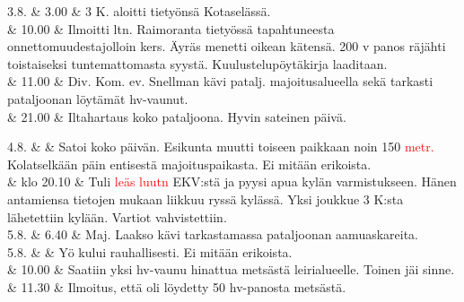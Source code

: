 \documentclass[11pt,a5paper,oneside]{book}
\begin{document}
\taulustop


3.8. & 3.00 & 3 K. aloitti tietyönsä Kotaselässä. \\

& 10.00 & Ilmoitti ltn. Raimoranta tietyössä tapahtuneesta onnettomuudestajolloin kers. Äyräs menetti oikean kätensä. 200 v panos räjähti toistaiseksi tuntemattomasta syystä. Kuulustelupöytäkirja laaditaan. \\

& 11.00 & Div. Kom. ev. Snellman kävi patalj. majoitusalueella sekä tarkasti pataljoonan löytämät hv-vaunut. \newline\newline\newline \\

& 21.00 & Iltahartaus koko pataljoona. \newline\newline Hyvin sateinen päivä. \\
\newpage

4.8. & & Satoi koko päivän. Esikunta muutti toiseen paikkaan noin 150 \textcolor{red}{metr.} Kolatselkään päin entisestä majoituspaikasta. \newline Ei mitään erikoista. \newline\newline \\

& klo 20.10 & Tuli \textcolor{red}{leäs luutn} EKV:stä ja pyysi apua kylän varmistukseen. Hänen antamiensa tietojen mukaan liikkuu ryssä kylässä. Yksi joukkue 3 K:sta lähetettiin kylään. Vartiot vahvistettiin. \newline \\

5.8. & 6.40 & Maj. Laakso kävi tarkastamassa pataljoonan aamuaskareita. \\

5.8. & & Yö kului rauhallisesti. Ei mitään erikoista. \\

& 10.00 & Saatiin yksi hv-vaunu hinattua metsästä leirialueelle. Toinen jäi sinne. \newline \\

& 11.30 & Ilmoitus, että oli löydetty 50 hv-panosta metsästä. \\

\taulustop
\end{document}
